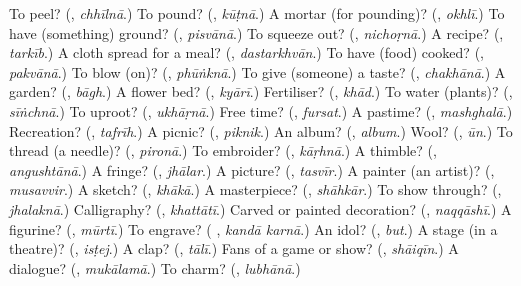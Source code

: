 \begin{tcolorbox}[breakable,colback=teal!4,colframe=teal!35!black,title={Before you move on}]
To peel? (\textbf{}, \emph{chhīlnā}.) To pound? (\textbf{}, \emph{kūṭnā}.) A mortar (for pounding)? (\textbf{}, \emph{okhlī}.) To have (something) ground? (\textbf{}, \emph{pisvānā}.) To squeeze out? (\textbf{}, \emph{nichoṛnā}.) A recipe? (\textbf{}, \emph{tarkīb}.) A cloth spread for a meal? (\textbf{}, \emph{dastarkhvān}.) To have (food) cooked? (\textbf{}, \emph{pakvānā}.) To blow (on)? (\textbf{}, \emph{phūṅknā}.) To give (someone) a taste? (\textbf{}, \emph{chakhānā}.) A garden? (\textbf{}, \emph{bāgh}.) A flower bed? (\textbf{}, \emph{kyārī}.) Fertiliser? (\textbf{}, \emph{khād}.) To water (plants)? (\textbf{}, \emph{sīṅchnā}.) To uproot? (\textbf{}, \emph{ukhāṛnā}.) Free time? (\textbf{}, \emph{fursat}.) A pastime? (\textbf{}, \emph{mashghalā}.) Recreation? (\textbf{}, \emph{tafrīh}.) A picnic? (\textbf{}, \emph{piknik}.) An album? (\textbf{}, \emph{album}.) Wool? (\textbf{}, \emph{ūn}.) To thread (a needle)? (\textbf{}, \emph{pironā}.) To embroider? (\textbf{}, \emph{kāṛhnā}.) A thimble? (\textbf{}, \emph{angushtānā}.) A fringe? (\textbf{}, \emph{jhālar}.) A picture? (\textbf{}, \emph{tasvīr}.) A painter (an artist)? (\textbf{}, \emph{musavvir}.) A sketch? (\textbf{}, \emph{khākā}.) A masterpiece? (\textbf{}, \emph{shāhkār}.) To show through? (\textbf{}, \emph{jhalaknā}.) Calligraphy? (\textbf{}, \emph{khattātī}.) Carved or painted decoration? (\textbf{}, \emph{naqqāshī}.) A figurine? (\textbf{}, \emph{mūrtī}.) To engrave? (\textbf{ }, \emph{kandā karnā}.) An idol? (\textbf{}, \emph{but}.) A stage (in a theatre)? (\textbf{}, \emph{isṭej}.) A clap? (\textbf{}, \emph{tālī}.) Fans of a game or show? (\textbf{}, \emph{shāiqīn}.) A dialogue? (\textbf{}, \emph{mukālamā}.) To charm? (\textbf{}, \emph{lubhānā}.)
\end{tcolorbox}
